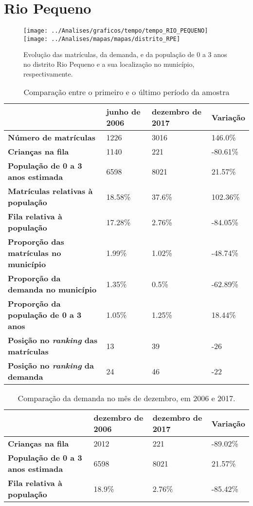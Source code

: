\section{Rio Pequeno}
\begin{figure}[H]
	\centering
	\texttt{[image: ../Analises/graficos/tempo/tempo\_RIO\_PEQUENO]}
	\texttt{[image: ../Analises/mapas/mapas/distrito\_RPE]}
	\caption{Evolução das matrículas, da demanda, e da população de 0 a 3 anos no distrito Rio Pequeno e a sua localização no município, respectivamente.}
\end{figure}
\begin{table}[H]
	\begin{tabular}{|l|l|l|l|}
		\hline
		\textbf{}                                      & \textbf{junho de 2006}       & \textbf{dezembro de 2017}    & \textbf{Variação} \\ \hline
		\textbf{Número de matrículas}                  & 1226 & 3016 & 146.0\% \\ \hline
		\textbf{Crianças na fila}                      & 1140 & 221 & -80.61\% \\ \hline
		\textbf{População de 0 a 3 anos estimada}      & 6598 & 8021 & 21.57\% \\ \hline
		\textbf{Matrículas relativas à população}      & 18.58\% & 37.6\% & 102.36\% \\ \hline
		\textbf{Fila relativa à população}             & 17.28\% & 2.76\% & -84.05\% \\ \hline
		\textbf{Proporção das matrículas no município} & 1.99\% & 1.02\% & -48.74\% \\ \hline
		\textbf{Proporção da demanda no município}     & 1.35\% & 0.5\% & -62.89\% \\ \hline
		\textbf{Proporção da população de 0 a 3 anos}  & 1.05\% & 1.25\% & 18.44\% \\ \hline
		\textbf{Posição no \textit{ranking} das matrículas}     & 13 & 39 & -26 \\ \hline
		\textbf{Posição no \textit{ranking} da demanda}         & 24 & 46 & -22 \\ \hline
	\end{tabular}
	\caption{Comparação entre o primeiro e o último período da amostra}
\end{table}
\begin{table}[H]
	\begin{tabular}{|l|l|l|l|}
		\hline
		\textbf{}                                 & \textbf{dezembro de 2006} & \textbf{dezembro de 2017} & \textbf{Variação} \\ \hline
		\textbf{Crianças na fila}                      & 2012 & 221 & -89.02\% \\ \hline
		\textbf{População de 0 a 3 anos estimada}      & 6598 & 8021 & 21.57\% \\ \hline
		\textbf{Fila relativa à população}             & 18.9\% & 2.76\% & -85.42\% \\ \hline
	\end{tabular}
	\caption{Comparação da demanda no mês de dezembro, em 2006 e 2017.}
\end{table}
